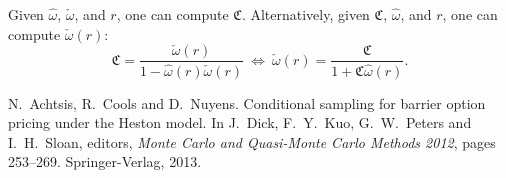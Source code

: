 \documentclass[graybox,footinfo]{svmult}
\newcommand{\homega}{\widehat{\omega}}
\newcommand{\wcomega}{\check{\omega}}
\newcommand{\fudge}{\mathfrak{C}}
\begin{document}
Given $\homega$, $\wcomega$, and $r$, one can compute $\fudge$.  Alternatively, given $\fudge$, $\homega$, and $r$, one can compute $\wcomega(r)$:
\[
\fudge = \frac{\wcomega(r)}{1 - \homega(r)\wcomega(r)} \ \iff \ \wcomega(r)= \frac{\fudge}{1+\fudge\homega(r)}.
\]






%


%
\begin{thebibliography}{99.}%
\nocite{Slo85,NiePil09a,DicEtal14a,DicHicLiu07a,Clancy2013,SloJoe94}
N.~Achtsis, R.~Cools and D.~Nuyens.
\newblock Conditional sampling for barrier option pricing under the Heston model.
\newblock In J.~Dick, F.~Y.\ Kuo, G.~W.\ Peters and I.~H.\ Sloan, editors, {\em {M}onte {C}arlo
  and Quasi-{M}onte {C}arlo Methods 2012}, pages 253--269. Springer-Verlag, 2013.

\end{thebibliography}
\end{document}
